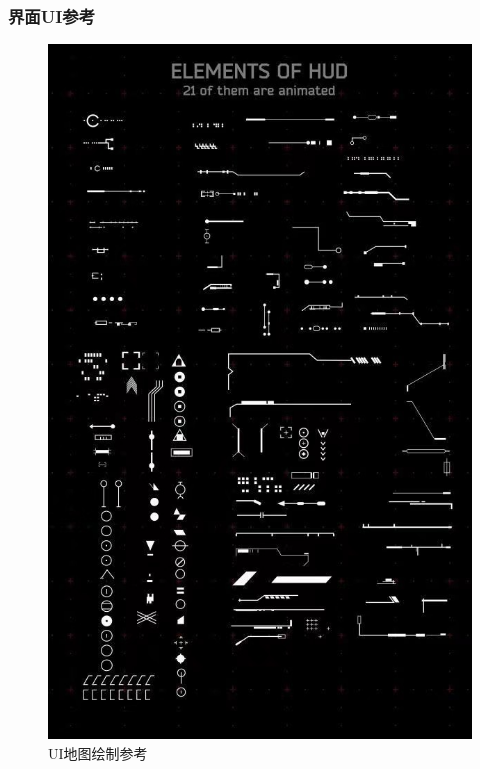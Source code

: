 \documentclass{ctexart}
\begin{document}
			\subsubsection{界面UI参考}
			\begin{figure}[H]
				\centering
				\includegraphics[scale=0.6]{material/UI设计参考1.jpeg}
				\caption{UI地图绘制参考}
			\end{figure}
\end{document}
